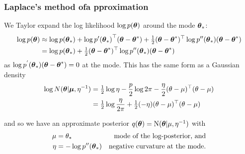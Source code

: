 \documentclass{beamer}
\begin{document}
\begin{frame}
	\frametitle{Laplace's method  ofa pproximation}
	We Taylor expand the log likelihood $\log{p({\boldsymbol\theta})}$ around the mode
	${\boldsymbol \theta}_*$:
	\tiny
	\begin{align*}
		\log{p({\boldsymbol\theta})} & \approx \log{p({\boldsymbol\theta}_*)} + \log{p'({\boldsymbol\theta}_*)}^\top ({\boldsymbol \theta} - {\boldsymbol \theta}^*) + \tfrac{1}{2} ({\boldsymbol \theta} - {\boldsymbol \theta}^*)^\top \log{p''({\boldsymbol\theta}_*)}({\boldsymbol \theta} - {\boldsymbol \theta}^*) \\
		                 & = \log{p({\boldsymbol\theta}_*)} + \tfrac{1}{2} ({\boldsymbol \theta} - {\boldsymbol \theta}^*)^\top \log{p''({\boldsymbol\theta}_*)}({\boldsymbol \theta} - {\boldsymbol \theta}^*)                                                        
	\end{align*}
	\small
	as $\log{p^{'}({\boldsymbol\theta}_*)}({\boldsymbol \theta} - {\boldsymbol \theta}^*) = 0$ at the mode. This has
	the same form as a Gaussian density
	\begin{align*}
		\log{N({\boldsymbol\theta}|{\boldsymbol\mu}, \eta^{-1})} & = \tfrac{1}{2} \log{\eta} - \frac{p}{2} \log{2 \pi} - \frac{\eta}{2} (\theta-\mu)^\top (\theta-\mu) \\
		                                 & = \tfrac{1}{2} \log{\frac{\eta}{2\pi}} + \tfrac{1}{2} (-\eta)(\theta-\mu)^\top (\theta-\mu)                
	\end{align*}
	
	and so we have an approximate posterior $q({\boldsymbol \theta}) = \text{N}({\boldsymbol \theta}|\mu, \eta^{-1})$ with
	\begin{align*}
		\mu  & = \theta_*              & \text{mode of the log-posterior, and}  \\
		\eta & = -\log{p''({\boldsymbol\theta}_*)} & \text{negative curvature at the mode.} \\
	\end{align*}
\end{frame}
\end{document}
